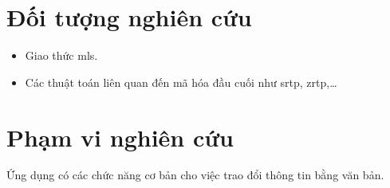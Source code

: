 \documentclass[../main-report.tex]{subfiles}
\begin{document}
\section{Đối tượng nghiên cứu}
\begin{itemize}
\item Giao thức \acrshort{mls}.
\item Các thuật toán liên quan đến mã hóa đầu cuối như \acrshort{srtp}, \acrshort{zrtp},…
\end{itemize}

\section{Phạm vi nghiên cứu}
Ứng dụng có các chức năng cơ bản cho việc trao đổi thông tin bằng văn bản.
\end{document}
